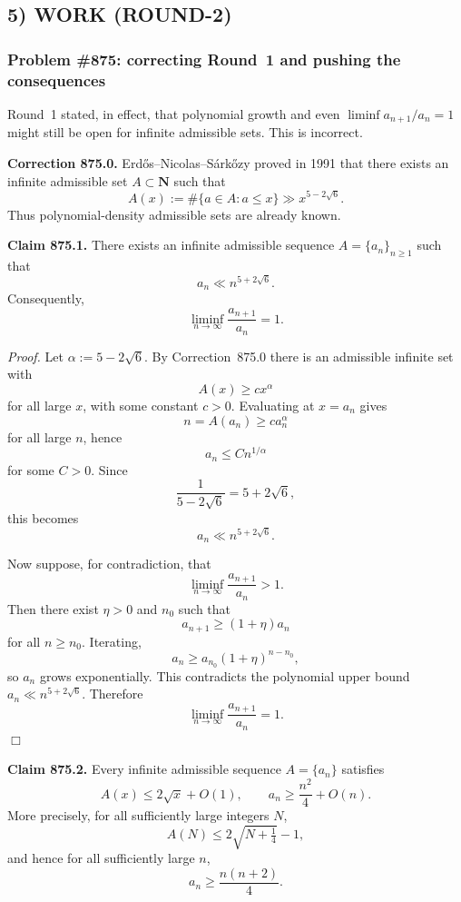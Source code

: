 \subsection*{5) WORK (ROUND-2)}

\subsubsection*{Problem \#875: correcting Round~1 and pushing the consequences}

Round~1 stated, in effect, that polynomial growth and even \(\liminf a_{n+1}/a_n=1\) might still be open for infinite admissible sets. This is incorrect.

\medskip
\noindent\textbf{Correction 875.0.} Erd\H{o}s--Nicolas--S\'ark\H{o}zy proved in 1991 that there exists an infinite admissible set \(A\subset \mathbf{N}\) such that
\[
  A(x) := \#\{a\in A : a\le x\} \gg x^{5-2\sqrt6}.
\]
Thus polynomial-density admissible sets are already known.

\medskip
\noindent\textbf{Claim 875.1.} There exists an infinite admissible sequence \(A=\{a_n\}_{n\ge 1}\) such that
\[
  a_n \ll n^{5+2\sqrt6}.
\]
Consequently,
\[
  \liminf_{n\to\infty}\frac{a_{n+1}}{a_n}=1.
\]

\medskip
\noindent\emph{Proof.}
Let \(\alpha:=5-2\sqrt6\). By Correction~875.0 there is an admissible infinite set with
\[
  A(x) \ge c x^{\alpha}
\]
for all large \(x\), with some constant \(c>0\). Evaluating at \(x=a_n\) gives
\[
  n = A(a_n) \ge c a_n^{\alpha}
\]
for all large \(n\), hence
\[
  a_n \le C n^{1/\alpha}
\]
for some \(C>0\). Since
\[
  \frac{1}{5-2\sqrt6}=5+2\sqrt6,
\]
this becomes
\[
  a_n \ll n^{5+2\sqrt6}.
\]

Now suppose, for contradiction, that
\[
  \liminf_{n\to\infty}\frac{a_{n+1}}{a_n} > 1.
\]
Then there exist \(\eta>0\) and \(n_0\) such that
\[
  a_{n+1} \ge (1+\eta)a_n
\]
for all \(n\ge n_0\). Iterating,
\[
  a_n \ge a_{n_0}(1+\eta)^{n-n_0},
\]
so \(a_n\) grows exponentially. This contradicts the polynomial upper bound \(a_n\ll n^{5+2\sqrt6}\). Therefore
\[
  \liminf_{n\to\infty}\frac{a_{n+1}}{a_n}=1.
\]
\hfill\(\Box\)

\medskip
\noindent\textbf{Claim 875.2.} Every infinite admissible sequence \(A=\{a_n\}\) satisfies
\[
  A(x) \le 2\sqrt x + O(1),
  \qquad
  a_n \ge \frac{n^2}{4} + O(n).
\]
More precisely, for all sufficiently large integers \(N\),
\[
  A(N) \le 2\sqrt{N+\tfrac14}-1,
\]
and hence for all sufficiently large \(n\),
\[
  a_n \ge \frac{n(n+2)}{4}.
\]

